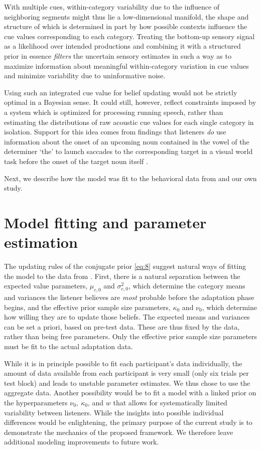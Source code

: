 With multiple cues, within-category variability due to the influence of neighboring segments might thus lie a low-dimensional manifold, the shape and structure of which is determined in part by how possible contexts influence the cue values corresponding to each category.  Treating the bottom-up sensory signal as a likelihood over intended productions \autocite[as do][]{Feldman2009a} and combining it with a structured prior in essence \emph{filters} the uncertain sensory estimates in such a way as to maximize information about meaningful within-category variation in cue values and minimize variability due to uninformative noise.

Using such an integrated cue value for belief updating would not be strictly optimal in a Bayesian sense. It could still, however, reflect constraints imposed by a system which is optimized for processing running speech, rather than estimating the distributions of raw acoustic cue values for each single category in isolation. Support for this idea comes from findings that listeners \emph{do} use information about the onset of an upcoming noun contained in the vowel of the determiner `the' to launch saccades to the corresponding target in a visual world task before the onset of the target noun itself \autocite{Salverda2014}.

Next, we describe how the model was fit to the behavioral data from \textcite{Vroomen2007} and our own study.


\section{Model fitting and parameter estimation}
\label{sec:model-fitt-param}

The updating rules of the conjugate prior \eqref{eq:8} suggest natural ways of fitting the model to the data from \textcite{Vroomen2007}.  First, there is a natural separation between the expected value parameters, $\mu_{c,0}$ and $\sigma^2_{c,0}$, which determine the category means and variances the listener believes are \emph{most} probable before the adaptation phase begins, and the effective prior sample size parameters, $\kappa_0$ and $\nu_0$, which determine how willing they are to update those beliefs.  The expected means and variances can be set a priori, based on pre-test data.  These are thus fixed by the data, rather than being free parameters.  Only the effective prior sample size parameters must be fit to the actual adaptation data.

While it is in principle possible to fit each participant's data individually, the amount of data available from each participant is very small (only six trials per test block) and leads to unstable parameter estimates. We thus chose to use the aggregate data.  Another possibility would be to fit a model with a linked prior on the hyperparameters $\nu_0,\ \kappa_0$, and $w$ that allows for systematically limited variability between listeners. While the insights into possible individual differences would be enlightening, the primary purpose of the current study is to demonstrate the mechanics of the proposed framework. We therefore leave additional modeling improvements to future work.


